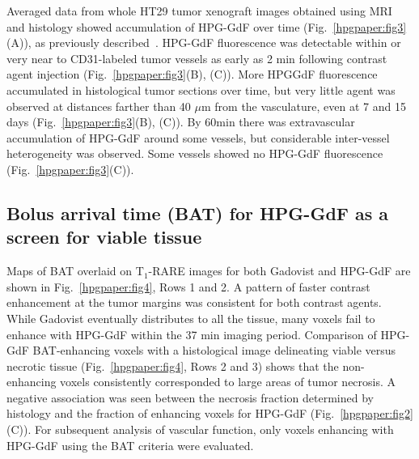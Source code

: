 Averaged data from whole HT29 tumor xenograft images obtained using MRI and histology showed accumulation of HPG-GdF over time (Fig.~\ref{hpgpaper:fig3}(A)), as previously described~\cite{Saatchi:2012hc}.
HPG-GdF fluorescence was detectable within or very near to CD31-labeled tumor vessels as early as 2 min following contrast agent injection (Fig.~\ref{hpgpaper:fig3}(B), (C)).
More HPGGdF fluorescence accumulated in histological tumor sections over time, but very little agent was observed at distances farther than 40 $\mu$m from the vasculature, even at 7 and 15 days (Fig.~\ref{hpgpaper:fig3}(B), (C)).
By 60min there was extravascular accumulation of HPG-GdF around some vessels, but considerable inter-vessel heterogeneity was observed.
Some vessels showed no HPG-GdF fluorescence (Fig.~\ref{hpgpaper:fig3}(C)).

\subsection{Bolus arrival time (BAT) for HPG-GdF as a screen for viable tissue}

Maps of BAT overlaid on T$_1$-RARE images for both Gadovist and HPG-GdF are shown in Fig.~\ref{hpgpaper:fig4}, Rows 1 and 2.
A pattern of faster contrast enhancement at the tumor margins was consistent for both contrast agents.
While Gadovist eventually distributes to all the tissue, many voxels fail to enhance with HPG-GdF within the 37 min imaging period.
Comparison of HPG-GdF BAT-enhancing voxels with a histological image delineating viable versus necrotic tissue (Fig.~\ref{hpgpaper:fig4}, Rows 2 and 3) shows that the non-enhancing voxels consistently corresponded to large areas of tumor necrosis.
A negative association was seen between the necrosis fraction determined by histology and the fraction of enhancing voxels for HPG-GdF (Fig.~\ref{hpgpaper:fig2}(C)).
For subsequent analysis of vascular function, only voxels enhancing with HPG-GdF using the BAT criteria were evaluated.

